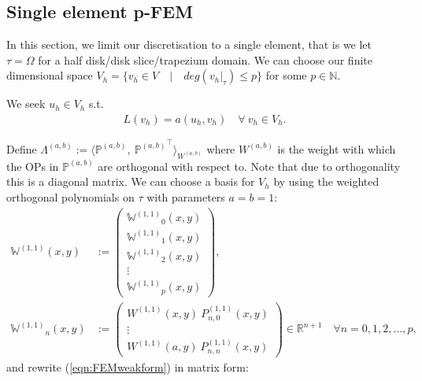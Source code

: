 \documentclass[11pt, oneside]{article}   	%
\newcommand{\R}{\mathbb{R}}
\newcommand{\N}{\mathbb{N}}
\newcommand{\bigP}{\mathbb{P}}
\newcommand{\Wii}{W^{(1,1)}}
\newcommand{\Pii}{P^{(1,1)}}
\newcommand{\element}{\tau}
\newcommand{\bigWii}{{\mathbb{W}^{(1,1)}}}
\begin{document}
\subsection{Single element p-FEM}
In this section, we limit our discretisation to a single element, that is we let $\element = \Omega$ for a half disk/disk slice/trapezium domain. We can choose our finite dimensional space $V_h = \{v_h \in V \quad | \quad deg(v_h|_\element) \le p\}$ for some $p \in \N$.

We seek $u_h \in V_h$ s.t.
\begin{align}
	L(v_h) = a(u_h,v_h) \quad \forall \: v_h \in V_h.
	\label{eqn:FEMweakform}
\end{align}

Define $\Lambda^{(a,b)} := \langle \bigP^{(a,b)}, \: {\bigP^{(a,b)}}^\top \rangle_{W^{(a,b)}}$ where $W^{(a,b)}$ is the weight with which the OPs in $\bigP^{(a,b)}$ are orthogonal with respect to. Note that due to orthogonality this is a diagonal matrix. We can choose a basis for $V_h$ by using the weighted orthogonal polynomials on $\element$ with parameters $a = b = 1$:
\begin{align}
\bigWii(x,y) &:= \begin{pmatrix}
		\bigWii_0(x,y) \\
		\bigWii_1(x,y) \\
		\bigWii_2(x,y) \\
		\vdots \\
		\bigWii_p(x,y)
	\end{pmatrix}, \\
\bigWii_n(x,y) &:= \begin{pmatrix}
		\Wii(x,y) \: \Pii_{n,0}(x,y) \\
		\vdots \\
		\Wii(a,y) \: \Pii_{n,n}(x,y)
	\end{pmatrix} \in \R^{n+1} \quad \forall n = 0,1,2,\dots,p,
\end{align}
and rewrite (\ref{eqn:FEMweakform}) in matrix form:
\end{document}

